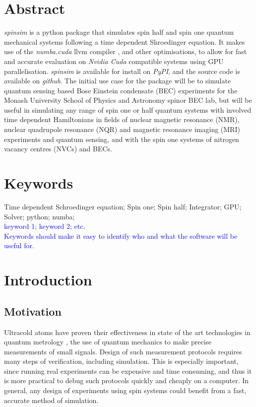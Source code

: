 \documentclass{jors}
\begin{document}
\section*{Abstract}
	\emph{spinsim} is a python package that simulates spin half and spin one quantum mechanical systems following a time dependent Shroedinger equation. It makes use of the \emph{numba.cuda} llvm compiler \cite{lam_numba_2015}, and other optimisations, to allow for fast and accurate evaluation on \emph{Nvidia Cuda} \cite{nickolls_scalable_2008} compatible systems using GPU parallelisation. \emph{spinsim} is available for install on \emph{PyPI}, and the source code is available on \emph{github}. The initial use case for the package will be to simulate quantum sensing based Bose Einstein condensate (BEC) experiments for the Monash University School of Physics and Astronomy spinor BEC lab, but will be useful in simulating any range of spin one or half quantum systems with involved time dependent Hamiltonians in fields of nuclear magnetic resonance (NMR), nuclear quadrupole resonance (NQR) and magnetic resonance imaging (MRI) experiments and quantum sensing, and with the spin one systems of nitrogen vacancy centres (NVCs) and BECs.

\section*{Keywords}
Time dependent Schroedinger equation; Spin one; Spin half; Integrator; GPU; Solver; python; numba;\\

\textcolor{blue}{keyword 1; keyword 2; etc. \\
Keywords should make it easy to identify who and what the software will be useful for.}

\section*{Introduction}
\subsection*{Motivation}
	Ultracold atoms have proven their effectiveness in state of the art technologies in quantum metrology \cite{huang_quantum_2014}, the use of quantum mechanics to make precise measurements of small signals. Design of such measurement protocols requires many steps of verification, including simulation. This is especially important, since running real experiments can be expensive and time consuming, and thus it is more practical to debug such protocols quickly and cheaply on a computer. In general, any design of experiments using spin systems could benefit from a fast, accurate method of simulation.\\
\end{document}
